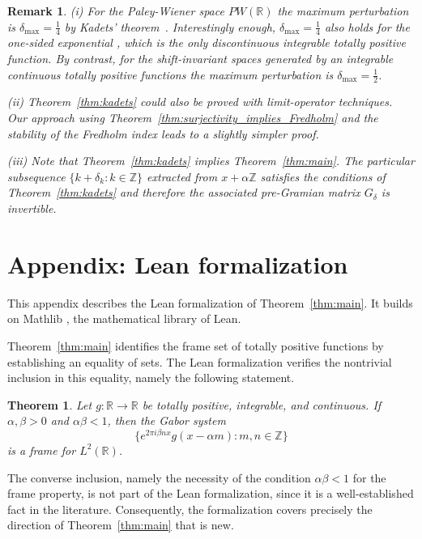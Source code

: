 \documentclass[reqno,a4paper,12pt]{amsart}
\numberwithin{equation}{section}
\newtheorem*{theorem*}{Theorem}
\newtheorem{remark}[definition]{Remark}
\def\Z{{\mathbb Z}}
\def\R{{\mathbb R}}
\newcommand\1{\mathds{1}}
\begin{document}
\begin{remark} {\rm 
  (i) For the Paley-Wiener space $PW(\R)$ the maximum perturbation is
  $\delta_{\max} = \tfrac{1}{4}$ by Kadets' theorem~\cite{Kadec1964}. 
Interestingly enough, $\delta_{\max} = \tfrac{1}{4}$ also holds for
the one-sided exponential  \cite{BelovEtAl2022}, which is the only
discontinuous integrable totally positive function. By contrast,  for the
shift-invariant spaces generated by an integrable \emph{continuous}
totally positive functions the maximum perturbation is  $\delta_{\max} = \tfrac{1}{2}$.  

(ii) Theorem~\ref{thm:kadets} could also be proved with limit-operator
techniques. Our approach using Theorem~\ref{thm:surjectivity_implies_Fredholm} and the stability of the
Fredholm index leads to  a slightly simpler proof.

(iii) Note that Theorem~\ref{thm:kadets} implies
Theorem~\ref{thm:main}. The particular subsequence  $\{k + \delta _k:
k\in \Z\}$ extracted from $x+\alpha \Z $ satisfies the conditions of
Theorem~\ref{thm:kadets} and therefore the associated pre-Gramian
matrix $G_\delta $ is invertible. }
\end{remark}


\section{Appendix: Lean formalization}

This appendix describes the Lean formalization of Theorem~\ref{thm:main}. It builds on Mathlib \cite{mathlib}, the mathematical library of Lean.

Theorem~\ref{thm:main} identifies the frame set of totally positive functions by establishing an equality of sets. The Lean formalization verifies the nontrivial inclusion in this equality, namely the following statement.

\begin{theorem*}
Let $g\colon\mathbb R\to\mathbb R$ be totally positive, integrable, and continuous.  If $\alpha,\beta>0$ and $\alpha\beta<1$, then the Gabor system
$$
  \bigl\{e^{2\pi i\beta n x}g(x-\alpha m):m,n\in\mathbb Z\bigr\}
$$
is a frame for $L^2(\mathbb R)$.
\end{theorem*}

The converse inclusion, namely the necessity of the condition $\alpha\beta<1$ for the frame property, is not part of the Lean formalization, since it is a well-established fact in the literature. Consequently, the formalization covers precisely the direction of Theorem~\ref{thm:main} that is new.
\end{document}
